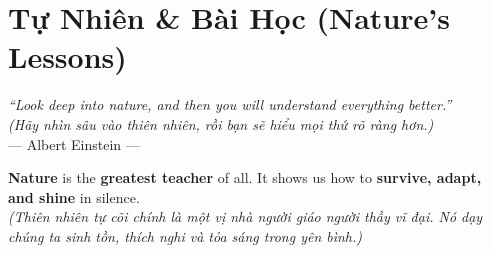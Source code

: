 \chapter{Tự Nhiên \& Bài Học (Nature's Lessons)}

\begin{center}
  \textit{\color{truyenblue}``Look deep into nature, and then you will understand everything better.''}\\
  \textit{(Hãy nhìn sâu vào thiên nhiên, rồi bạn sẽ hiểu mọi thứ rõ ràng hơn.)}\\[4pt]
  \small\color{truyengold}--- Albert Einstein ---
\end{center}

\ngancach

\begin{tcolorbox}[
  colback=truyenred!5, colframe=truyenred!40, arc=6pt,
  title={\bfseries Người Thầy Vĩ Đại (A Great Teacher)},
  fonttitle=\bfseries\color{truyenred}
]
  \textbf{Nature} is the \textbf{greatest teacher} of all. It shows us how to \textbf{survive, adapt, and shine} in silence.\\
  \textit{(Thiên nhiên tự cõi chính là một vị nhà người giáo người thầy vĩ đại. Nó dạy chúng ta sinh tồn, thích nghi và tỏa sáng trong yên bình.)}
\end{tcolorbox}

\vspace{0.6cm}

\ngayDay{}
